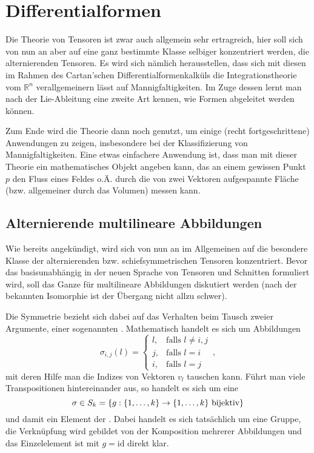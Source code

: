 \documentclass[../H_Analysis_main.tex]{subfiles}
\begin{document}
\setcounter{chapter}{5}

\chapter{Differentialformen}
\begin{center}
Die Theorie von Tensoren ist zwar auch allgemein sehr ertragreich, hier soll sich von nun an aber auf eine ganz bestimmte Klasse selbiger konzentriert werden, die alternierenden Tensoren. Es wird sich nämlich herausstellen, dass sich mit diesen im Rahmen des Cartan'schen Differentialformenkalküls die Integrationstheorie vom $\mathbb{R}^n$ verallgemeinern lässt auf Mannigfaltigkeiten. Im Zuge dessen lernt man nach der Lie-Ableitung eine zweite Art kennen, wie Formen abgeleitet werden können.

Zum Ende wird die Theorie dann noch genutzt, um einige (recht fortgeschrittene) Anwendungen zu zeigen, insbesondere bei der Klassifizierung von Mannigfaltigkeiten. Eine etwas einfachere Anwendung ist, dass man mit dieser Theorie ein mathematisches Objekt angeben kann, das an einem gewissen Punkt $p$ den Fluss eines Feldes o.Ä. durch die von zwei Vektoren aufgespannte Fläche (bzw. allgemeiner durch das Volumen) messen kann.
\end{center}


\newpage


	\section{Alternierende multilineare Abbildungen}
Wie bereits angekündigt, wird sich von nun an im Allgemeinen auf die besondere Klasse der alternierenden bzw. schiefsymmetrischen Tensoren konzentriert. Bevor das basisunabhängig in der neuen Sprache von Tensoren und Schnitten formuliert wird, soll das Ganze für multilineare Abbildungen diskutiert werden (nach der bekannten Isomorphie ist der Übergang nicht allzu schwer).

Die Symmetrie bezieht sich dabei auf das Verhalten beim Tausch zweier Argumente, einer sogenannten . Mathematisch handelt es sich um Abbildungen
\begin{equation}
\sigma_{i, j}(l) = \begin{cases} l, & \text{falls } l \neq i, j \\ j, & \text{falls } l = i \\ i, & \text{falls } l = j \end{cases} \, ,
\end{equation}
mit deren Hilfe man die Indizes von Vektoren $v_l$ tauschen kann. Führt man viele Transpositionen hintereinander aus, so handelt es sich um eine 
\begin{equation}
\sigma \in S_k = \qty{g: \qty{1, \dots, k} \rightarrow \qty{1, \dots, k} \text{ bijektiv}}
\end{equation}
und damit ein Element der . Dabei handelt es sich tatsächlich um eine Gruppe, die Verknüpfung wird gebildet von der Komposition mehrerer Abbildungen und das Einzelelement ist mit $g = \text{id}$ direkt klar.
\end{document}
